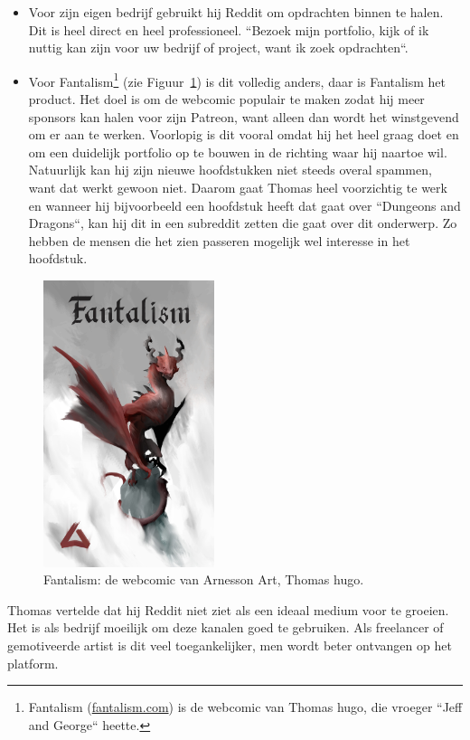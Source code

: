 \begin{itemize} 
	\item Voor zijn eigen bedrijf gebruikt hij Reddit om opdrachten binnen te halen. Dit is heel direct en heel professioneel. ``Bezoek mijn portfolio, kijk of ik nuttig kan zijn voor uw bedrijf of project, want ik zoek opdrachten``.
	\item Voor Fantalism\footnote{Fantalism (\href{https://fantalism.com/}{fantalism.com}) is de webcomic van Thomas hugo, die vroeger ``Jeff and George`` heette.} (zie Figuur~\ref{fig:fantalism}) is dit volledig anders, daar is Fantalism het product. Het doel is om de webcomic populair te maken zodat hij meer sponsors kan halen voor zijn Patreon, want alleen dan wordt het winstgevend om er aan te werken. Voorlopig is dit vooral omdat hij het heel graag doet en om een duidelijk portfolio op te bouwen in de richting waar hij naartoe wil. Natuurlijk kan hij zijn nieuwe hoofdstukken niet steeds overal spammen, want dat werkt gewoon niet. Daarom gaat Thomas heel voorzichtig te werk en wanneer hij bijvoorbeeld een hoofdstuk heeft dat gaat over ``Dungeons and Dragons``, kan hij dit in een subreddit zetten die gaat over dit onderwerp. Zo hebben de mensen die het zien passeren mogelijk wel interesse in het hoofdstuk.
\end{itemize} 
\begin{figure}[h!]
	\includegraphics[width=50mm,scale=0.5]{img/arnesson-art-fantalism.jpg}
	\centering
	\caption{Fantalism: de webcomic van Arnesson Art, Thomas hugo.}
	\label{fig:fantalism}
\end{figure}
Thomas vertelde dat hij Reddit niet ziet als een ideaal medium voor te groeien. Het is als bedrijf moeilijk om deze kanalen goed te gebruiken. Als freelancer of gemotiveerde artist is dit veel toegankelijker, men wordt beter ontvangen op het platform.
	
